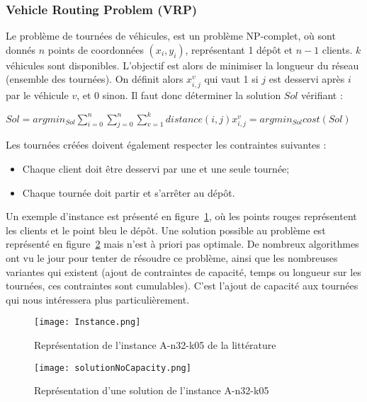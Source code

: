 \documentclass[a4paper,11pt]{article}%
\begin{document}
\subsubsection{Vehicle Routing Problem (VRP)}

Le problème de tournées de véhicules, est un problème NP-complet, où sont donnés $n$ points de coordonnées $(x_i,y_i)$, représentant 1 dépôt et $n-1$ clients. $k$ véhicules sont disponibles. 
L'objectif est alors de minimiser la longueur du réseau (ensemble des tournées). 
On définit alors $x_{i,j}^v$ qui vaut 1 si $j$ est desservi après $i$ par le véhicule $v$, et 0 sinon. 
Il faut donc déterminer la solution $Sol$ vérifiant :
\begin{center}
$ Sol = argmin_{Sol} \sum_{i = 0}^{n} \sum_{j = 0}^{n} \sum_{v = 1}^{k} distance(i,j) x_{i,j}^v = argmin_{Sol}cost(Sol)$
\end{center}

Les tournées créées doivent également respecter les contraintes suivantes :
\begin{itemize}
\item Chaque client doit être desservi par une et une seule tournée;
\item Chaque tournée doit partir et s'arrêter au dépôt.
\end{itemize}

Un exemple d'instance est présenté en figure~\ref{Instance3205}, où les points rouges représentent les clients et le point bleu le dépôt. Une solution possible au problème est représenté en figure~\ref{SNC3205} mais n'est à priori pas optimale. 
De nombreux algorithmes ont vu le jour pour tenter de résoudre ce problème, ainsi que les nombreuses variantes qui existent (ajout de contraintes de capacité, temps ou longueur sur les tournées, ces contraintes sont cumulables). 
C'est l'ajout de capacité aux tournées qui nous intéressera plus particulièrement.


\begin{figure}

\centering
\texttt{[image: Instance.png]}
\caption{Représentation de l'instance A-n32-k05 de la littérature}
\label{Instance3205}
\end{figure}

\begin{figure}

\centering
\texttt{[image: solutionNoCapacity.png]}
\caption{Représentation d'une solution de l'instance A-n32-k05}
\label{SNC3205}
\end{figure}
\end{document}
